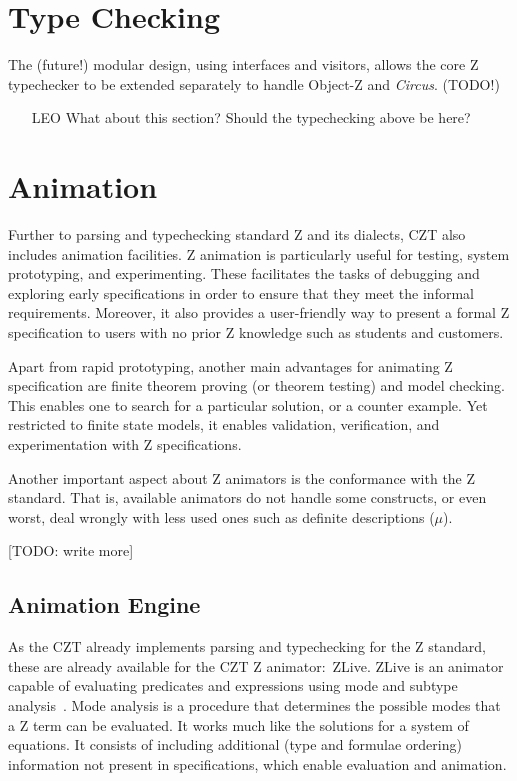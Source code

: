 \documentclass{llncs}
\newcommand{\Circus}{{\sf\slshape Circus}}
\begin{document}
\section{Type Checking}

      The (future!) modular design, using interfaces and visitors,
      allows the core Z typechecker to be extended separately
      to handle Object-Z and \Circus.  (TODO!)

    \begin{itemize}
        \item[LEO] What about this section? Should the typechecking above be here?
    \end{itemize}

\section{Animation}

    Further to parsing and typechecking standard Z and its dialects, CZT also includes
    animation facilities. Z animation is particularly useful for testing, system prototyping,
    and experimenting. These facilitates the tasks of debugging and exploring early
    specifications in order to ensure that they meet the informal requirements.
    Moreover, it also provides a user-friendly way to present a formal Z specification
    to users with no prior Z knowledge such as students and customers.

    Apart from rapid prototyping, another main advantages for animating Z specification
    are finite theorem proving (or theorem testing) and model checking.
    This enables one to search for a particular solution, or a counter example.
    Yet restricted to finite state models, it enables validation, verification, and
    experimentation with Z specifications.

    Another important aspect about Z animators is the conformance with the Z standard.
    That is, available animators do not handle some constructs, or even worst, deal
    wrongly with less used ones such as definite descriptions ($\mu$).

    [TODO: write more]

\subsection{Animation Engine}

    As the CZT already implements parsing and typechecking for the Z standard,
    these are already available for the CZT Z animator:~ZLive.
    ZLive is an animator capable of evaluating predicates and expressions using
    mode and subtype analysis~\cite{winikooff98}.
    Mode analysis is a procedure that determines the possible modes that a
    Z term can be evaluated. It works much like the solutions for a system of equations.
    It consists of including additional (type and formulae ordering) information not
    present in specifications, which enable evaluation and animation.
\end{document}
